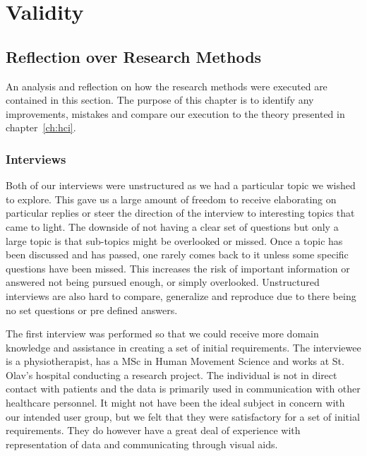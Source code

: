 \chapter{Validity}


\section{Reflection over Research Methods}
An analysis and reflection on how the research methods were executed are contained in this section. The purpose of this chapter is to identify any improvements, mistakes and compare our execution to the theory presented in chapter~\ref{ch:hci}.

\subsection{Interviews}
Both of our interviews were unstructured as we had a particular topic we wished to explore. This gave us a large amount of freedom to receive elaborating on particular replies or steer the direction of the interview to interesting topics that came to light. The downside of not having a clear set of questions but only a large topic is that sub-topics might be overlooked or missed. Once a topic has been discussed and has passed, one rarely comes back to it unless some specific questions have been missed. This increases the risk of important information or answered not being pursued enough, or simply overlooked. Unstructured interviews are also hard to compare, generalize and reproduce due to there being no set questions or pre defined answers.

The first interview was performed so that we could receive more domain knowledge and assistance in creating a set of initial requirements. The interviewee is a physiotherapist, has a MSc in Human Movement Science and works at St. Olav's hospital conducting a research project. The individual is not in direct contact with patients and the data is primarily used in communication with other healthcare personnel. It might not have been the ideal subject in concern with our intended user group, but we felt that they were satisfactory for a set of initial requirements. They do however have a great deal of experience with representation of data and communicating through visual aids.

